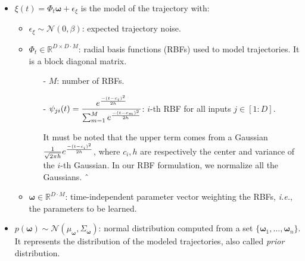 \documentclass[utf8]{frontiersSCNS} %
\newcommand{\rev}[1]{\textcolor{blue}{#1}}
\newcommand{\todo}[1]{\textcolor{red}{\textbf{/*#1*/}}}
\begin{document}
\begin{itemize}
\item $\xi(t) = \Phi_t \boldsymbol{\omega} + \epsilon_\xi$ is the model of the trajectory with:
\begin{itemize}
\item $\epsilon_\xi \sim \mathcal{N}(0, \beta)$: expected trajectory noise.
\item $\Phi_t \in \mathbb{R}^{D\times D \cdot M}$: radial basis functions (RBFs) used to model trajectories. It is a block diagonal matrix.
\begin{itemize}
\item[-] $M$: number of RBFs.
\item[-] $ \psi_{ji}(t) =\dfrac{e^{-(t - c_i)^2 \over 2h}}{\sum_{m=1}^{M} e^{-(t - c_m)^2 \over 2h} }$: $i$-th RBF for all inputs $j \in [1:D]$. 

It must be noted that the upper term comes from a Gaussian $\frac{1}{\sqrt{2\pi h}} e^{-(t - c_i)^2 \over 2h}$, where $ c_i, h$ are respectively the center and variance of the $i$-th Gaussian. In our RBF formulation, we normalize all the Gaussians.
ˆ%
\end{itemize}
\item $\boldsymbol{\omega} \in \mathbb{R}^{D \cdot M}$: time-independent parameter vector weighting the RBFs, \textit{i.e.}, the parameters to be learned.

\end{itemize}

\item $p(\boldsymbol{\omega}) \sim \mathcal{N}(\mu_{\boldsymbol{\omega}}, \Sigma_{\boldsymbol{\omega}})$: normal distribution computed from a set $\{\boldsymbol{\omega}_1, \ldots, \boldsymbol{\omega}_n\}$. It represents the distribution of the modeled trajectories, also called \textit{prior} distribution.



\end{itemize}
\end{document}
